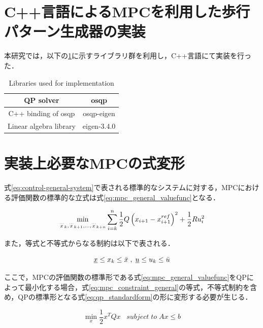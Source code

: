 \section{C++言語によるMPCを利用した歩行パターン生成器の実装}

本研究では，以下の\ref{tb:library}に示すライブラリ群を利用し，C++言語にて実装を行った．

\begin{table}[htbp]
  \centering
  \begin{tabular}{|c|c|} \hline
    QP solver              & osqp\cite{OSQP}            \\ \hline
    C++ binding of osqp    & osqp-eigen\cite{OSQPEIGEN} \\ \hline
    Linear algebra library & eigen-3.4.0\cite{EIGEN}    \\ \hline
  \end{tabular}
  \caption{Libraries used for implementation}
  \label{tb:library}
\end{table}


\section{実装上必要なMPCの式変形}
式\eqref{eq:control-general-system}で表される標準的なシステムに対する，MPCにおける評価関数の標準的な立式は式\eqref{eq:mpc_general_valuefunc}となる．

\begin{equation}
  \min_{{\buildrel\ldots\over{x}}_{k},{\buildrel\ldots\over{x}}_{k+1},\ldots,{\buildrel\ldots\over{x}}_{k+n}}\sum_{i=k}^{n}{1\over 2}Q\left(x_{i+1}-x_{i+1}^{ref}\right)^{2}+{1\over 2}R{u}_{i}^{2}
  \label{eq:mpc_general_valuefunc}
\end{equation}

また，等式と不等式からなる制約は以下で表される．

\begin{equation}
  \underbar{$x$} \leq x_{k} \leq  \bar{x} \; ,\; \underbar{$u$} \leq u_{k} \leq \bar{u}
  \label{eq:mpc_constraint_general}
\end{equation}


ここで，MPCの評価関数の標準形である式\eqref{eq:mpc_general_valuefunc}をQPによって最小化する場合，式\eqref{eq:mpc_constraint_general}の等式，不等式制約を含め，QPの標準形となる式\eqref{eq:qp_standardform}の形に変形する必要が生じる．

\begin{equation}
  \underset{x}{\min} \frac{1}{2}x^TQx \;\;\; subject \; to \; Ax \leq b
  \label{eq:qp_standardform}
\end{equation}

